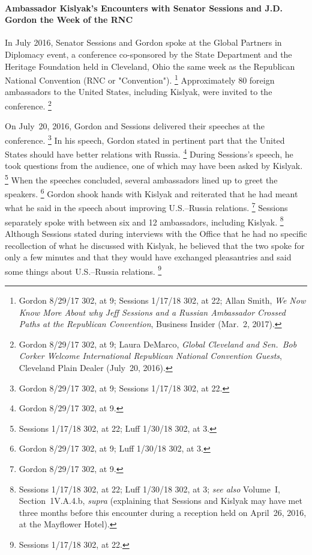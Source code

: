 \paragraph{Ambassador Kislyak's Encounters with Senator Sessions and J.D. Gordon the Week of the RNC}

In July 2016, Senator Sessions and Gordon spoke at the Global Partners in Diplomacy event, a conference co-sponsored by the State Department and the Heritage Foundation held in Cleveland, Ohio the same week as the Republican National Convention (RNC or "Convention").%
\footnote{Gordon 8/29/17 302, at 9;
Sessions 1/17/18 302, at 22;
Allan Smith, \textit{We Now Know More About why Jeff Sessions and a Russian Ambassador Crossed Paths at the Republican Convention}, Business Insider (Mar.~2, 2017).}
Approximately 80 foreign ambassadors to the United States, including Kislyak, were invited to the conference.%
\footnote{Gordon 8/29/17 302, at 9;
Laura DeMarco, \textit{Global Cleveland and Sen.~Bob Corker Welcome International Republican National Convention Guests}, Cleveland Plain Dealer (July~20, 2016).
}

On July~20, 2016, Gordon and Sessions delivered their speeches at the conference.%
\footnote{Gordon 8/29/17 302, at 9;
Sessions 1/17/18 302, at 22.}
In his speech, Gordon stated in pertinent part that the United States should have better relations with Russia.%
\footnote{Gordon 8/29/17 302, at 9.}
During Sessions's speech, he took questions from the audience, one of which may have been asked by Kislyak.%
\footnote{Sessions 1/17/18 302, at 22;
Luff 1/30/18 302, at 3.}
When the speeches concluded, several ambassadors lined up to greet the speakers.%
\footnote{Gordon 8/29/17 302, at 9;
Luff 1/30/18 302, at 3.}
Gordon shook hands with Kislyak and reiterated that he had meant what he said in the speech about improving U.S.--Russia relations.%
\footnote{Gordon 8/29/17 302, at 9.}
Sessions separately spoke with between six and 12 ambassadors, including Kislyak.%
\footnote{Sessions 1/17/18 302, at 22; Luff 1/30/18 302, at 3;
\textit{see also} Volume~I, Section~1V.A.4.b, \textit{supra} (explaining that Sessions and Kislyak may have met three months before this encounter during a reception held on April~26, 2016, at the Mayflower Hotel).}
Although Sessions stated during interviews with the Office that he had no specific recollection of what he discussed with Kislyak, he believed that the two spoke for only a few minutes and that they would have exchanged pleasantries and said some things about U.S.--Russia relations.%
\footnote{Sessions 1/17/18 302, at 22.}

